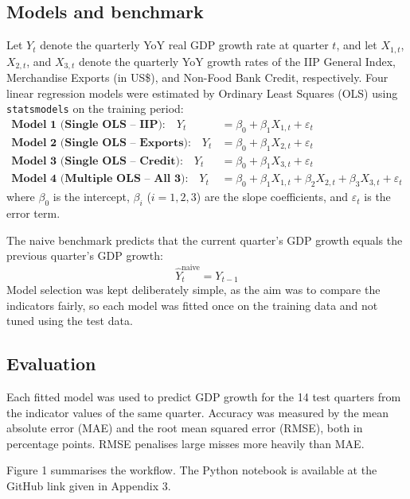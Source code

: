 \documentclass[11pt, a4paper]{article}
\begin{document}
\subsection{Models and benchmark}
Let $Y_t$ denote the quarterly YoY real GDP growth rate at quarter $t$, and let $X_{1,t}$, $X_{2,t}$, and $X_{3,t}$ denote the quarterly YoY growth rates of the IIP General Index, Merchandise Exports (in US\$), and Non-Food Bank Credit, respectively. Four linear regression models were estimated by Ordinary Least Squares (OLS) using \texttt{statsmodels} on the training period:
\begin{align}
    \textbf{Model 1 (Single OLS -- IIP):} \quad Y_t &= \beta_0 + \beta_1 X_{1,t} + \varepsilon_t \\
    \textbf{Model 2 (Single OLS -- Exports):} \quad Y_t &= \beta_0 + \beta_1 X_{2,t} + \varepsilon_t \\
    \textbf{Model 3 (Single OLS -- Credit):} \quad Y_t &= \beta_0 + \beta_1 X_{3,t} + \varepsilon_t \\
    \textbf{Model 4 (Multiple OLS -- All 3):} \quad Y_t &= \beta_0 + \beta_1 X_{1,t} + \beta_2 X_{2,t} + \beta_3 X_{3,t} + \varepsilon_t
\end{align}
where $\beta_0$ is the intercept, $\beta_i$ ($i = 1, 2, 3$) are the slope coefficients, and $\varepsilon_t$ is the error term.

The naive benchmark predicts that the current quarter's GDP growth equals the previous quarter's GDP growth:
\[
\hat{Y}_t^{\text{naive}} = Y_{t-1}
\]
Model selection was kept deliberately simple, as the aim was to compare the indicators fairly, so each model was fitted once on the training data and not tuned using the test data.

\subsection{Evaluation}
Each fitted model was used to predict GDP growth for the 14 test quarters from the indicator values of the same quarter. Accuracy was measured by the mean absolute error (MAE) and the root mean squared error (RMSE), both in percentage points. RMSE penalises large misses more heavily than MAE.

Figure 1 summarises the workflow. The Python notebook is available at the GitHub link given in Appendix 3.
\end{document}
